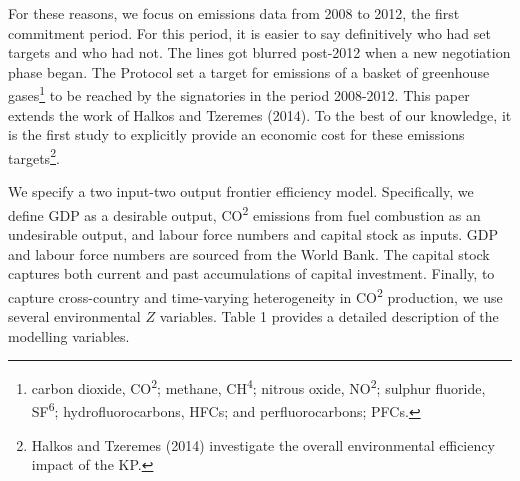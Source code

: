 \documentclass[
  10pt,
]{article}
\begin{document}
For these reasons, we focus on emissions data from 2008 to 2012, the
first commitment period. For this period, it is easier to say
definitively who had set targets and who had not. The lines got blurred
post-2012 when a new negotiation phase began. The Protocol set a target
for emissions of a basket of greenhouse gases\footnote{carbon dioxide,
  CO\textsuperscript{2}; methane, CH\textsuperscript{4}; nitrous oxide,
  NO\textsuperscript{2}; sulphur fluoride, SF\textsuperscript{6};
  hydrofluorocarbons, HFCs; and perfluorocarbons; PFCs.} to be reached
by the signatories in the period 2008-2012. This paper extends the work
of Halkos and Tzeremes (2014). To the best of our knowledge, it is the
first study to explicitly provide an economic cost for these emissions
targets\footnote{Halkos and Tzeremes (2014) investigate the overall
  environmental efficiency impact of the KP.}.

We specify a two input-two output frontier efficiency model.
Specifically, we define GDP as a desirable output, CO\textsuperscript{2}
emissions from fuel combustion as an undesirable output, and labour
force numbers and capital stock as inputs. GDP and labour force numbers
are sourced from the World Bank. The capital stock captures both current
and past accumulations of capital investment. Finally, to capture
cross-country and time-varying heterogeneity in CO\textsuperscript{2}
production, we use several environmental \(Z\) variables. Table 1
provides a detailed description of the modelling variables.

\begingroup\fontsize{8}{10}\selectfont
\end{document}
